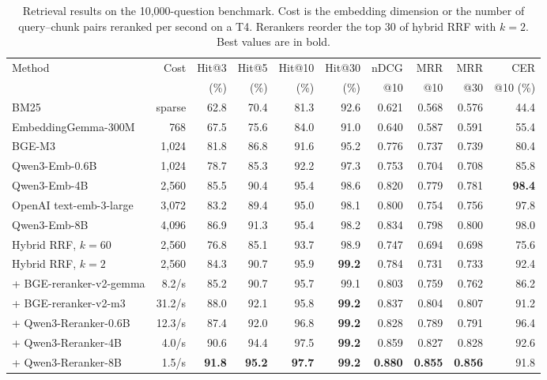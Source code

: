 \begin{table}[tb]
\centering
\caption{Retrieval results on the 10{,}000-question benchmark. Cost is the embedding dimension or the number of query--chunk pairs reranked per second on a T4. Rerankers reorder the top 30 of hybrid RRF with $k=2$. Best values are in bold.}
\label{tab:retrieval}
\scriptsize
\setlength{\tabcolsep}{2.1pt}
\begin{tabular}{lrrrrrrrrr}
\toprule
Method & Cost & Hit@3 & Hit@5 & Hit@10 & Hit@30 & nDCG & MRR & MRR & CER \\
 & & (\%) & (\%) & (\%) & (\%) & @10 & @10 & @30 & @10 (\%) \\
\midrule
BM25 & sparse & 62.8 & 70.4 & 81.3 & 92.6 & 0.621 & 0.568 & 0.576 & 44.4 \\
EmbeddingGemma-300M & 768 & 67.5 & 75.6 & 84.0 & 91.0 & 0.640 & 0.587 & 0.591 & 55.4 \\
BGE-M3 & 1{,}024 & 81.8 & 86.8 & 91.6 & 95.2 & 0.776 & 0.737 & 0.739 & 80.4 \\
Qwen3-Emb-0.6B & 1{,}024 & 78.7 & 85.3 & 92.2 & 97.3 & 0.753 & 0.704 & 0.708 & 85.8 \\
Qwen3-Emb-4B & 2{,}560 & 85.5 & 90.4 & 95.4 & 98.6 & 0.820 & 0.779 & 0.781 & \textbf{98.4} \\
OpenAI text-emb-3-large & 3{,}072 & 83.2 & 89.4 & 95.0 & 98.1 & 0.800 & 0.754 & 0.756 & 97.8 \\
Qwen3-Emb-8B & 4{,}096 & 86.9 & 91.3 & 95.4 & 98.2 & 0.834 & 0.798 & 0.800 & 98.0 \\
\midrule
Hybrid RRF, $k{=}60$ & 2{,}560 & 76.8 & 85.1 & 93.7 & 98.9 & 0.747 & 0.694 & 0.698 & 75.6 \\
Hybrid RRF, $k{=}2$ & 2{,}560 & 84.3 & 90.7 & 95.9 & \textbf{99.2} & 0.784 & 0.731 & 0.733 & 92.4 \\
\midrule
+ BGE-reranker-v2-gemma & 8.2/s & 85.2 & 90.7 & 95.7 & 99.1 & 0.803 & 0.759 & 0.762 & 86.2 \\
+ BGE-reranker-v2-m3 & 31.2/s & 88.0 & 92.1 & 95.8 & \textbf{99.2} & 0.837 & 0.804 & 0.807 & 91.2 \\
+ Qwen3-Reranker-0.6B & 12.3/s & 87.4 & 92.0 & 96.8 & \textbf{99.2} & 0.828 & 0.789 & 0.791 & 96.4 \\
+ Qwen3-Reranker-4B & 4.0/s & 90.6 & 94.4 & 97.5 & \textbf{99.2} & 0.859 & 0.827 & 0.828 & 92.6 \\
+ Qwen3-Reranker-8B & 1.5/s & \textbf{91.8} & \textbf{95.2} & \textbf{97.7} & \textbf{99.2} & \textbf{0.880} & \textbf{0.855} & \textbf{0.856} & 91.8 \\
\bottomrule
\end{tabular}
\end{table}
